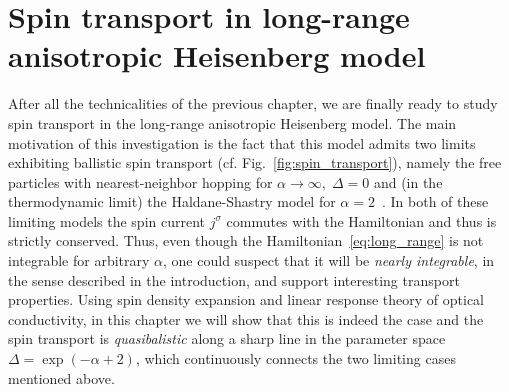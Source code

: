 \chapter{Spin transport in long-range anisotropic Heisenberg model\label{chap:spin_transport}}
\thispagestyle{chapterBeginStyle}

After all the technicalities of the previous chapter, we are finally ready to study spin transport in
the long-range anisotropic Heisenberg model. The main motivation of this investigation is the fact that this model admits 
two limits exhibiting ballistic spin transport (cf. Fig.~\ref{fig:spin_transport}), namely the free particles
with nearest-neighbor hopping for \(\alpha\to \infty,\; \Delta = 0\) and (in the thermodynamic limit) the Haldane-Shastry
model for \(\alpha = 2\)~\autocite{Haldane1988,Shastry1988}. In both of these limiting models the spin current 
\(j^{\sigma}\) commutes with the Hamiltonian and thus is strictly conserved. Thus, even though
the Hamiltonian~\eqref{eq:long_range} is not integrable for arbitrary \(\alpha\), one could suspect
that it will be \textit{nearly integrable}, in the sense described in the introduction, and support
interesting transport properties. Using spin density expansion and linear response theory of optical conductivity,
in this chapter we will show that this is indeed the case and the spin transport is \textit{quasibalistic} along a sharp
line in the parameter space \(\Delta = \exp(- \alpha + 2)\), which continuously connects the two limiting
cases mentioned above.

